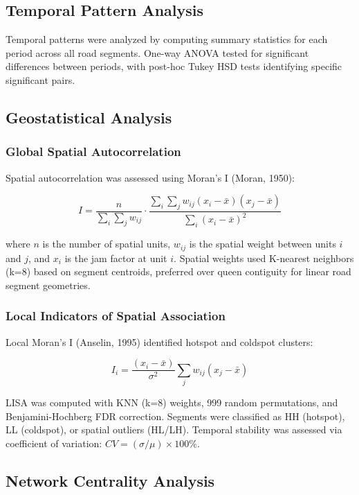 \documentclass[12pt,a4paper]{article}
\begin{document}
\subsection{Temporal Pattern Analysis}

Temporal patterns were analyzed by computing summary statistics for each period across all road segments. One-way ANOVA tested for significant differences between periods, with post-hoc Tukey HSD tests identifying specific significant pairs.

\subsection{Geostatistical Analysis}

\subsubsection{Global Spatial Autocorrelation}

Spatial autocorrelation was assessed using Moran's I (Moran, 1950):

\[I = \frac{n}{\sum_i \sum_j w_{ij}} \cdot \frac{\sum_i \sum_j w_{ij}(x_i - \bar{x})(x_j - \bar{x})}{\sum_i (x_i - \bar{x})^2}\]

where $n$ is the number of spatial units, $w_{ij}$ is the spatial weight between units $i$ and $j$, and $x_i$ is the jam factor at unit $i$. Spatial weights used K-nearest neighbors (k=8) based on segment centroids, preferred over queen contiguity for linear road segment geometries.

\subsubsection{Local Indicators of Spatial Association}

Local Moran's I (Anselin, 1995) identified hotspot and coldspot clusters:

\[I_i = \frac{(x_i - \bar{x})}{\sigma^2} \sum_j w_{ij}(x_j - \bar{x})\]

LISA was computed with KNN (k=8) weights, 999 random permutations, and Benjamini-Hochberg FDR correction. Segments were classified as HH (hotspot), LL (coldspot), or spatial outliers (HL/LH). Temporal stability was assessed via coefficient of variation: $CV = (\sigma/\mu) \times 100\%$.

\subsection{Network Centrality Analysis}
\end{document}
